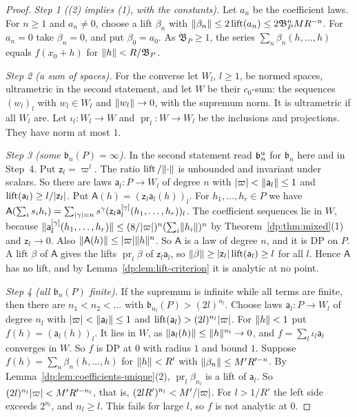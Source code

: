 \begin{proof}
\emph{Step 1 ((2) implies (1), with the constants).} Let $a_n$ be the coefficient laws. For $n\ge1$ and $a_n\ne0$, choose a lift $\beta_n$ with $\lVert \beta_n\rVert\le2\operatorname{lift}(a_n)\le2\mathfrak B_P^nMR^{-n}$. For $a_n=0$ take $\beta_n=0$, and put $\beta_0=a_0$. As $\mathfrak B_P\ge1$, the series $\sum_n\beta_n(h,\dots,h)$ equals $f(x_0+h)$ for $\lVert h\rVert<R/\mathfrak B_P$.

\emph{Step 2 (a sum of spaces).} For the converse let $W_l$, $l\ge1$, be normed spaces, ultrametric in the second statement, and let $W$ be their $c_0$-sum: the sequences $(w_l)_l$ with $w_l\in W_l$ and $\lVert w_l\rVert\to0$, with the supremum norm. It is ultrametric if all $W_l$ are. Let $\iota_l\colon W_l\to W$ and $\operatorname{pr}_l\colon W\to W_l$ be the inclusions and projections. They have norm at most $1$.

\emph{Step 3 (some $\mathfrak b_n(P)=\infty$).} In the second statement read $\mathfrak b^{\rm u}_n$ for $\mathfrak b_n$ here and in Step~4. Put $\mathsf z_l=\varpi^l$. The ratio $\operatorname{lift}/\lVert \cdot\rVert$ is unbounded and invariant under scalars. So there are laws $\mathsf a_l\colon P\to W_l$ of degree $n$ with $\lvert \varpi\rvert<\lVert \mathsf a_l\rVert\le1$ and $\operatorname{lift}(\mathsf a_l)\ge l/\lvert \mathsf z_l\rvert$. Put $\mathsf A(h)=(\mathsf z_l\mathsf a_l(h))_l$. For $h_1,\dots,h_r\in P$ we have $\mathsf A(\sum_is_ih_i)=\sum_{\lvert \gamma\rvert=n}s^\gamma(\mathsf z_l\mathsf a_l^{[\gamma]}(h_1,\dots,h_r))_l$. The coefficient sequences lie in $W$, because $\lVert \mathsf a_l^{[\gamma]}(h_1,\dots,h_r)\rVert\le(8/\lvert \varpi\rvert)^n(\sum_i\lVert h_i\rVert)^n$ by Theorem~\ref{dp:thm:mixed}(1) and $\mathsf z_l\to0$. Also $\lVert \mathsf A(h)\rVert\le\lvert \varpi\rvert\lVert h\rVert^n$. So $\mathsf A$ is a law of degree $n$, and it is DP on $P$. A lift $\beta$ of $\mathsf A$ gives the lifts $\operatorname{pr}_l\beta$ of $\mathsf z_l\mathsf a_l$, so $\lVert \beta\rVert\ge\lvert \mathsf z_l\rvert\operatorname{lift}(\mathsf a_l)\ge l$ for all $l$. Hence $\mathsf A$ has no lift, and by Lemma~\ref{dp:lem:lift-criterion} it is analytic at no point.

\emph{Step 4 (all $\mathfrak b_n(P)$ finite).} If the supremum is infinite while all terms are finite, then there are $n_1<n_2<\dots$ with $\mathfrak b_{n_l}(P)>(2l)^{n_l}$. Choose laws $\mathsf a_l\colon P\to W_l$ of degree $n_l$ with $\lvert \varpi\rvert<\lVert \mathsf a_l\rVert\le1$ and $\operatorname{lift}(\mathsf a_l)>(2l)^{n_l}\lvert \varpi\rvert$. For $\lVert h\rVert<1$ put $f(h)=(\mathsf a_l(h))_l$. It lies in $W$, as $\lVert \mathsf a_l(h)\rVert\le\lVert h\rVert^{n_l}\to0$, and $f=\sum_l\iota_l\mathsf a_l$ converges in $W$. So $f$ is DP at $0$ with radius $1$ and bound $1$. Suppose $f(h)=\sum_n\beta_n(h,\dots,h)$ for $\lVert h\rVert<R'$ with $\lVert \beta_n\rVert\le M'R'^{-n}$. By Lemma~\ref{dp:lem:coefficients-unique}(2), $\operatorname{pr}_l\beta_{n_l}$ is a lift of $\mathsf a_l$. So $(2l)^{n_l}\lvert \varpi\rvert<M'R'^{-n_l}$, that is, $(2lR')^{n_l}<M'/\lvert \varpi\rvert$. For $l>1/R'$ the left side exceeds $2^{n_l}$, and $n_l\ge l$. This fails for large $l$, so $f$ is not analytic at $0$.
\end{proof}

